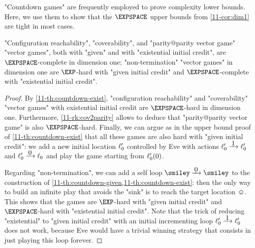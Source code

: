 "Countdown games" are frequently employed to prove complexity lower
bounds.  Here, we use them to show that the $\EXPSPACE$  upper bounds
from \cref{11-cor:dim1} are tight in most cases.
\begin{theorem}
\label{11-th:dim1}
  "Configuration reachability", "coverability", and "parity@parity
  vector game" "vector games", both with "given" and with "existential
  initial credit", are $\EXPSPACE$-complete in dimension one;
  "non-termination" "vector games" in dimension one are $\EXP$-hard with
  "given initial credit" and $\EXPSPACE$-complete with "existential
  initial credit".
\end{theorem}
\begin{proof}
  By \cref{11-th:countdown-exist}, "configuration reachability" and
  "coverability" "vector games" with existential initial credit
  are $\EXPSPACE$-hard in dimension one.
  Furthermore, \cref{11-rk:cov2parity} allows to deduce that
  "parity@parity vector game" is also $\EXPSPACE$-hard.  Finally, we can
  argue as in the upper bound proof of \cref{11-th:countdown-exist} that
  all these games are also hard with "given initial credit": we add a
  new initial location $\ell'_0$ controlled by Eve with actions
  $\loc'_0\step 1\loc'_0$ and $\loc'_0\step 0\loc_0$ and play the game
  starting from $\ell'_0(0)$.

  Regarding "non-termination", we can add a self loop $\smiley\step
  0\smiley$ to the construction
  of \cref{11-th:countdown-given,11-th:countdown-exist}: then the only way
  to build an infinite play that avoids the "sink" is to reach the
  target location $\smiley$.  This shows that the games are $\EXP$-hard
  with "given initial credit" and $\EXPSPACE$-hard with "existential
  initial credit".  Note that the trick of reducing "existential" to
  "given initial credit" with an initial incrementing loop $\loc'_0\step
  1\loc'_0$ does not work, because Eve would have a trivial winning
  strategy that consists in just playing this loop forever.
\end{proof}


